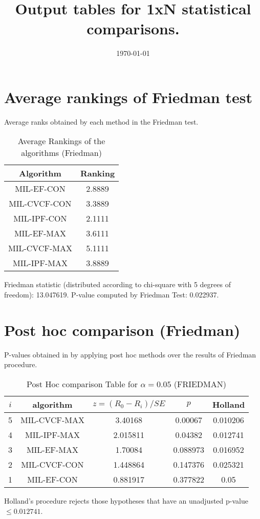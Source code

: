 \documentclass[a4paper,10pt]{article}
\title{Output tables for 1xN statistical comparisons.}
\author{}
\date{\today}
\begin{document}
\begin{landscape}
\pagestyle{empty}
\maketitle
\thispagestyle{empty}

\section{Average rankings of Friedman test}


Average ranks obtained by each method in the Friedman test.

\begin{table}[!htp]
\centering
\begin{tabular}{|c|c|}\hline
Algorithm&Ranking\\\hline
MIL-EF-CON&2.8889\\MIL-CVCF-CON&3.3889\\MIL-IPF-CON&2.1111\\MIL-EF-MAX&3.6111\\MIL-CVCF-MAX&5.1111\\MIL-IPF-MAX&3.8889\\\hline\end{tabular}
\caption{Average Rankings of the algorithms (Friedman)}
\end{table}

Friedman statistic (distributed according to chi-square with 5 degrees of freedom): 13.047619. \newline P-value computed by Friedman Test: 0.022937.\newline


\newpage

\section{Post hoc comparison (Friedman)}


P-values obtained in by applying post hoc methods over the results of Friedman procedure.

\begin{table}[!htp]
\centering\footnotesize
\begin{tabular}{ccccc}
$i$&algorithm&$z=(R_0 - R_i)/SE$&$p$&Holland\\
\hline5&MIL-CVCF-MAX&3.40168&0.00067&0.010206\\4&MIL-IPF-MAX&2.015811&0.04382&0.012741\\3&MIL-EF-MAX&1.70084&0.088973&0.016952\\2&MIL-CVCF-CON&1.448864&0.147376&0.025321\\1&MIL-EF-CON&0.881917&0.377822&0.05\\\hline
\end{tabular}
\caption{Post Hoc comparison Table for $\alpha=0.05$ (FRIEDMAN)}
\end{table}Holland's procedure rejects those hypotheses that have an unadjusted p-value $\le0.012741$.



\end{landscape}
\end{document}
